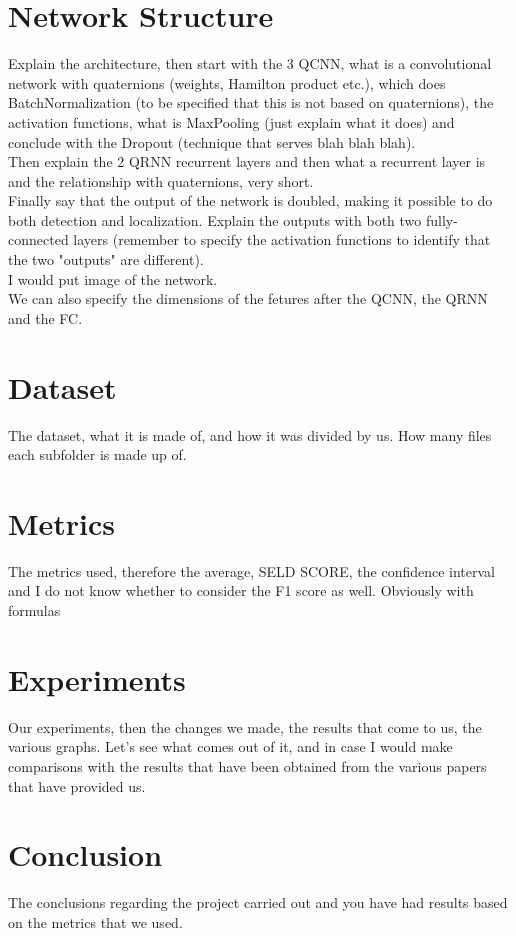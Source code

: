 \documentclass{article}
\begin{document}
    \section{Network Structure}
    Explain the architecture, then start with the 3 QCNN, what is a convolutional network with quaternions 
    (weights, Hamilton product etc.), which does BatchNormalization (to be specified that this is not based on quaternions), 
    the activation functions, what is MaxPooling (just explain what it does) and conclude with the Dropout (technique that serves 
    blah blah blah).
    \\ Then explain the 2 QRNN recurrent layers and then what a recurrent layer is and the relationship with quaternions, very short.
    \\ Finally say that the output of the network is doubled, making it possible to do both detection and localization. 
    Explain the outputs with both two fully-connected layers (remember to specify the activation functions to identify that the two 
    "outputs" are different).
    \\I would put image of the network.
    \\We can also specify the dimensions of the fetures after the QCNN, the QRNN and the FC.
    \section{Dataset}
    The dataset, what it is made of, and how it was divided by us. How many files each subfolder is made up of.
    \section{Metrics}
    The metrics used, therefore the average, SELD SCORE, the confidence interval and I do not know whether to consider the F1 score as well. Obviously with formulas 
    \section{Experiments}
    Our experiments, then the changes we made, the results that come to us, the various graphs.
Let's see what comes out of it, and in case I would make comparisons with the results that have been obtained from the various papers that have provided us.
    \section{Conclusion}
    The conclusions regarding the project carried out and you have had results based on the metrics that we used.
\end{document}
